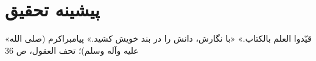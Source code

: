 \chapter{پیشینه تحقیق}
\label{ch2}
\bottomquote
{«قیّدوا العلم بالکتاب.»}
{«با نگارش، دانش را در بند خویش کشید.»}
{پیامبراکرم (صلی الله علیه وآله وسلم)؛ تحف العقول، ص 36}
\clearpage


%
%
%



